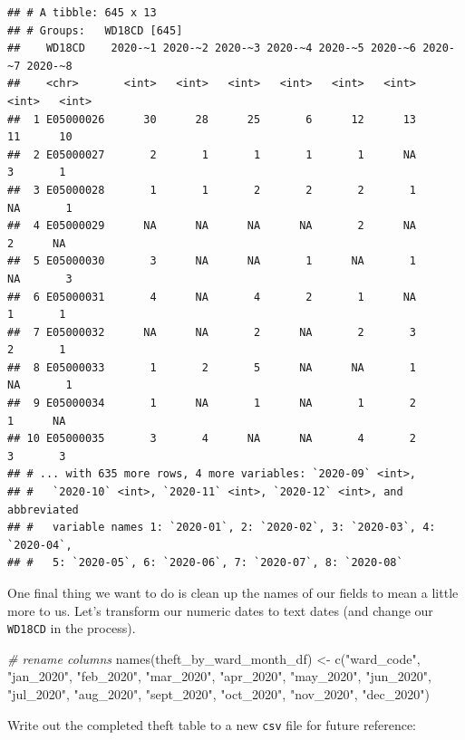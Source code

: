 \documentclass[
]{book}
\newenvironment{Shaded}{\begin{snugshade}}{\end{snugshade}}
\newcommand{\CommentTok}[1]{\textcolor[rgb]{0.56,0.35,0.01}{\textit{#1}}}
\newcommand{\FunctionTok}[1]{\textcolor[rgb]{0.00,0.00,0.00}{#1}}
\newcommand{\NormalTok}[1]{#1}
\newcommand{\OtherTok}[1]{\textcolor[rgb]{0.56,0.35,0.01}{#1}}
\newcommand{\StringTok}[1]{\textcolor[rgb]{0.31,0.60,0.02}{#1}}
\begin{document}
\begin{verbatim}
## # A tibble: 645 x 13
## # Groups:   WD18CD [645]
##    WD18CD    2020-~1 2020-~2 2020-~3 2020-~4 2020-~5 2020-~6 2020-~7 2020-~8
##    <chr>       <int>   <int>   <int>   <int>   <int>   <int>   <int>   <int>
##  1 E05000026      30      28      25       6      12      13      11      10
##  2 E05000027       2       1       1       1       1      NA       3       1
##  3 E05000028       1       1       2       2       2       1      NA       1
##  4 E05000029      NA      NA      NA      NA       2      NA       2      NA
##  5 E05000030       3      NA      NA       1      NA       1      NA       3
##  6 E05000031       4      NA       4       2       1      NA       1       1
##  7 E05000032      NA      NA       2      NA       2       3       2       1
##  8 E05000033       1       2       5      NA      NA       1      NA       1
##  9 E05000034       1      NA       1      NA       1       2       1      NA
## 10 E05000035       3       4      NA      NA       4       2       3       3
## # ... with 635 more rows, 4 more variables: `2020-09` <int>,
## #   `2020-10` <int>, `2020-11` <int>, `2020-12` <int>, and abbreviated
## #   variable names 1: `2020-01`, 2: `2020-02`, 3: `2020-03`, 4: `2020-04`,
## #   5: `2020-05`, 6: `2020-06`, 7: `2020-07`, 8: `2020-08`
\end{verbatim}

One final thing we want to do is clean up the names of our fields to mean a little more to us. Let's transform our numeric dates to text dates (and change our \texttt{WD18CD} in the process).

\begin{Shaded}
\begin{Highlighting}[]
\CommentTok{\# rename columns}
\FunctionTok{names}\NormalTok{(theft\_by\_ward\_month\_df) }\OtherTok{\textless{}{-}} \FunctionTok{c}\NormalTok{(}\StringTok{"ward\_code"}\NormalTok{, }\StringTok{"jan\_2020"}\NormalTok{, }\StringTok{"feb\_2020"}\NormalTok{, }\StringTok{"mar\_2020"}\NormalTok{,}
    \StringTok{"apr\_2020"}\NormalTok{, }\StringTok{"may\_2020"}\NormalTok{, }\StringTok{"jun\_2020"}\NormalTok{, }\StringTok{"jul\_2020"}\NormalTok{, }\StringTok{"aug\_2020"}\NormalTok{, }\StringTok{"sept\_2020"}\NormalTok{,}
    \StringTok{"oct\_2020"}\NormalTok{, }\StringTok{"nov\_2020"}\NormalTok{, }\StringTok{"dec\_2020"}\NormalTok{)}
\end{Highlighting}
\end{Shaded}

Write out the completed theft table to a new \texttt{csv} file for future reference:
\end{document}
